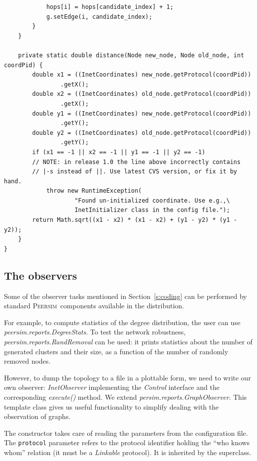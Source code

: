 \documentclass[a4paper,11pt]{article}
\newcommand{\id}[1]{{\scshape\small #1}}
\newcommand{\psim}{\id{Peersim}}
\begin{document}
\begin{verbatim}
            hops[i] = hops[candidate_index] + 1;
            g.setEdge(i, candidate_index);
        }
    }

    private static double distance(Node new_node, Node old_node, int coordPid) {
        double x1 = ((InetCoordinates) new_node.getProtocol(coordPid))
                .getX();
        double x2 = ((InetCoordinates) old_node.getProtocol(coordPid))
                .getX();
        double y1 = ((InetCoordinates) new_node.getProtocol(coordPid))
                .getY();
        double y2 = ((InetCoordinates) old_node.getProtocol(coordPid))
                .getY();
        if (x1 == -1 || x2 == -1 || y1 == -1 || y2 == -1)
        // NOTE: in release 1.0 the line above incorrectly contains
        // |-s instead of ||. Use latest CVS version, or fix it by hand.
            throw new RuntimeException(
                    "Found un-initialized coordinate. Use e.g.,\
                    InetInitializer class in the config file.");
        return Math.sqrt((x1 - x2) * (x1 - x2) + (y1 - y2) * (y1 - y2));
    }
}
\end{verbatim}
\normalsize

\subsection{The observers}
\label{s:observers}

Some of the observer tasks mentioned in Section~\ref{s:coding} can be performed
by standard \psim\ components available in the distribution. 

For example, to compute statistics of the degree distribution, the user can
use \emph{peersim.reports.DegreeStats}. To test the network
robustness, \emph{peersim.reports.RandRemoval} can be used:
it prints statistics about the number of generated clusters and their
size, as a function of the number of randomly removed nodes.

However, to dump the topology to a file in a plottable form, we
need to write our own observer:
\emph{InetObserver} implementing the \emph{Control}
interface and the corresponding 
\emph{execute()} method.
We extend \emph{persim.reports.GraphObserver}.
This template class gives us  useful functionality to simplify dealing
with the observation of graphs.

The constructor takes care of reading the parameters from the
configuration file. The \texttt{protocol} parameter refers to the
protocol identifier holding the ``who knows whom'' relation (it must be a
\emph{Linkable} protocol). It is inherited by the superclass.
\end{document}
